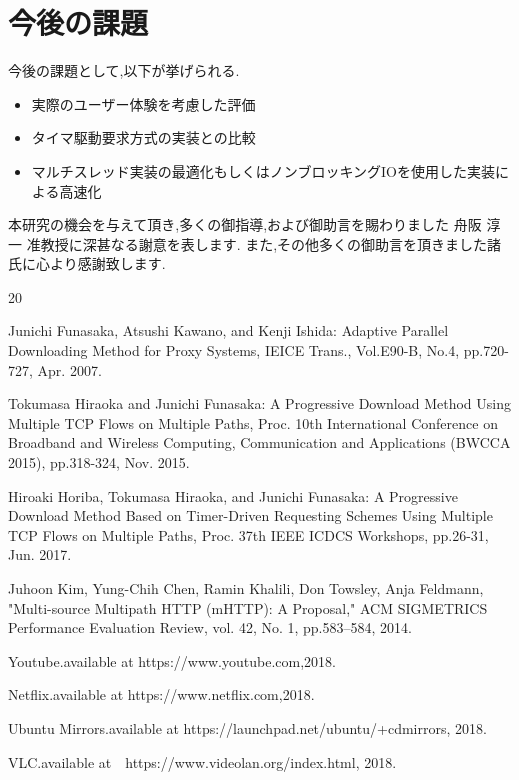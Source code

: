 \documentclass[a4j,12pt]{gradthesis_utf8}
\begin{document}
\section{今後の課題}
\hspace*{0.5em}今後の課題として,以下が挙げられる.
\begin{itemize}
    \item 実際のユーザー体験を考慮した評価
    \item タイマ駆動要求方式の実装との比較
    \item マルチスレッド実装の最適化もしくはノンブロッキングIOを使用した実装による高速化
\end{itemize}

\clearpage
%
\begin{acknowledgment}
 本研究の機会を与えて頂き,多くの御指導,および御助言を賜わりました
舟阪 淳一 准教授に深甚なる謝意を表します.
また,その他多くの御助言を頂きました諸氏に心より感謝致します.
\end{acknowledgment}
\begin {thebibliography}{20} 

Junichi Funasaka, Atsushi Kawano, and Kenji Ishida: Adaptive Parallel Downloading Method for Proxy Systems, IEICE Trans., Vol.E90-B, No.4, pp.720-727, Apr. 2007.

Tokumasa Hiraoka and Junichi Funasaka: A Progressive Download Method Using Multiple TCP Flows on Multiple Paths, Proc. 10th International Conference on Broadband and Wireless Computing, Communication and Applications (BWCCA 2015), pp.318-324, Nov. 2015. 

Hiroaki Horiba, Tokumasa Hiraoka, and Junichi Funasaka: A Progressive Download Method Based on Timer-Driven Requesting Schemes Using Multiple TCP Flows on Multiple Paths, Proc. 37th IEEE ICDCS Workshops, pp.26-31, Jun. 2017.

Juhoon Kim, Yung-Chih Chen, Ramin Khalili, Don Towsley, Anja Feldmann,
"Multi-source Multipath HTTP (mHTTP): A Proposal,"
ACM SIGMETRICS Performance Evaluation Review, vol. 42, No. 1, pp.583--584, 2014.

Youtube.available at https://www.youtube.com,2018.

Netflix.available at https://www.netflix.com,2018.

Ubuntu Mirrors.available at https://launchpad.net/ubuntu/+cdmirrors, 2018.

VLC.available at　https://www.videolan.org/index.html, 2018.

\end {thebibliography}
\end{document}
